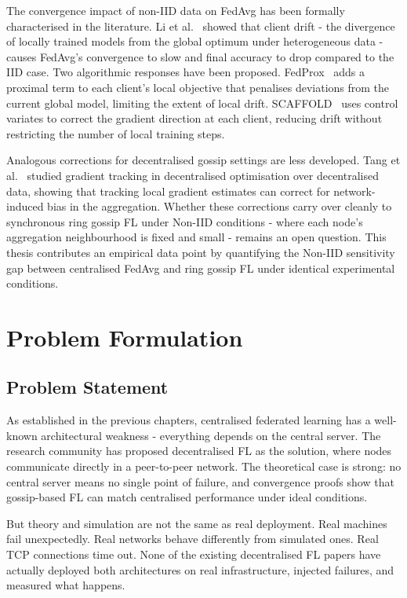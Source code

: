 \documentclass[12pt]{report}
\begin{document}
The convergence impact of non-IID data on FedAvg has been formally characterised
in the literature. Li et al.~\cite{li2020} showed that client drift - the
divergence of locally trained models from the global optimum under heterogeneous
data - causes FedAvg's convergence to slow and final accuracy to drop compared
to the IID case. Two algorithmic responses have been proposed. FedProx~\cite{li2020}
adds a proximal term to each client's local objective that penalises deviations
from the current global model, limiting the extent of local drift.
SCAFFOLD~\cite{karimireddy2020} uses control variates to correct the gradient
direction at each client, reducing drift without restricting the number of local
training steps.

Analogous corrections for decentralised gossip settings are less developed.
Tang et al.~\cite{tang2018} studied gradient tracking in decentralised
optimisation over decentralised data, showing that tracking local gradient
estimates can correct for network-induced bias in the aggregation. Whether
these corrections carry over cleanly to synchronous ring gossip FL under
Non-IID conditions - where each node's aggregation neighbourhood is fixed
and small - remains an open question. This thesis contributes an empirical
data point by quantifying the Non-IID sensitivity gap between centralised
FedAvg and ring gossip FL under identical experimental conditions.

\chapter{Problem Formulation}

\section{Problem Statement}

As established in the previous chapters, centralised federated learning has a
well-known architectural weakness - everything depends on the central server.
The research community has proposed decentralised FL as the solution, where nodes
communicate directly in a peer-to-peer network. The theoretical case is strong:
no central server means no single point of failure, and convergence proofs show
that gossip-based FL can match centralised performance under ideal conditions.

But theory and simulation are not the same as real deployment. Real machines
fail unexpectedly. Real networks behave differently from simulated ones. Real
TCP connections time out. None of the existing decentralised FL papers have
actually deployed both architectures on real infrastructure, injected failures,
and measured what happens.
\end{document}
